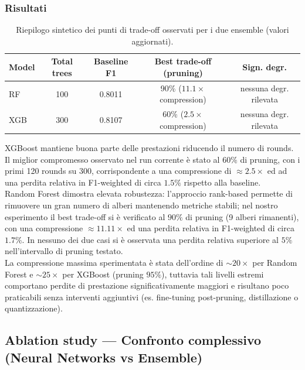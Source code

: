 \documentclass[a4paper,12pt]{report}
\begin{document}
	\subsubsection{Risultati}
	\begin{table}[H]
		\centering
		\setlength{\tabcolsep}{2pt}
		\begin{tabular}{lcccc}
			\toprule
			\textbf{Model} & \textbf{Total trees} & \textbf{Baseline F1} & \textbf{Best trade-off (pruning)} & \textbf{Sign. degr.} \\
			\midrule
			RF & 100 & 0.8011 & 90\% ($11.1\times$ compression) & nessuna degr. rilevata \\
			XGB       & 300 & 0.8107 & 60\% ($2.5\times$ compression) & nessuna degr. rilevata \\
			\bottomrule
		\end{tabular}
		\caption{Riepilogo sintetico dei punti di trade-off osservati per i due ensemble (valori aggiornati).}
	\end{table}
	
	XGBoost mantiene buona parte delle prestazioni riducendo il numero di rounds. Il miglior compromesso osservato nel run corrente è stato al $60\%$ di pruning, con i primi 120 rounds su 300, corrispondente a una compressione di $\approx 2.5\times$ ed ad una perdita relativa in F1-weighted di circa $1.5\%$ rispetto alla baseline. \\
	Random Forest dimostra elevata robustezza: l'approccio rank-based permette di rimuovere un gran numero di alberi mantenendo metriche stabili; nel nostro esperimento il best trade-off si è verificato al $90\%$ di pruning (9 alberi rimanenti), con una compressione $\approx 11.11\times$ ed una perdita relativa in F1-weighted di circa $1.7\%$. In nessuno dei due casi si è osservata una perdita relativa superiore al $5\%$ nell'intervallo di pruning testato. \\
	La compressione massima sperimentata è stata dell'ordine di $\sim 20\times$ per Random Forest e $\sim 25\times$ per XGBoost (pruning $95\%$), tuttavia tali livelli estremi comportano perdite di prestazione significativamente maggiori e risultano poco praticabili senza interventi aggiuntivi (es. fine-tuning post-pruning, distillazione o quantizzazione).
	
	\subsection{Ablation study — Confronto complessivo (Neural Networks vs Ensemble)}
	
\end{document}
